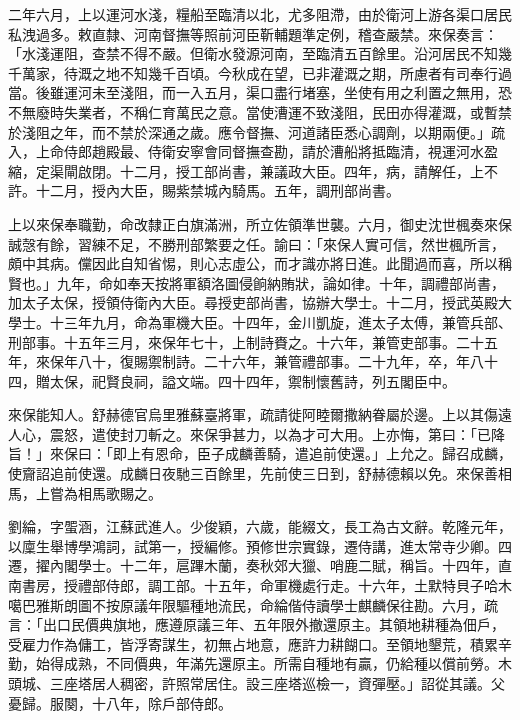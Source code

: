\begin{pinyinscope}
二年六月，上以運河水淺，糧船至臨清以北，尤多阻滯，由於衛河上游各渠口居民私洩過多。敕直隸、河南督撫等照前河臣靳輔題準定例，稽查嚴禁。來保奏言：「水淺運阻，查禁不得不嚴。但衛水發源河南，至臨清五百餘里。沿河居民不知幾千萬家，待溉之地不知幾千百頃。今秋成在望，已非灌溉之期，所慮者有司奉行過當。後雖運河未至淺阻，而一入五月，渠口盡行堵塞，坐使有用之利置之無用，恐不無廢時失業者，不稱仁育萬民之意。當使漕運不致淺阻，民田亦得灌溉，或暫禁於淺阻之年，而不禁於深通之歲。應令督撫、河道諸臣悉心調劑，以期兩便。」疏入，上命侍郎趙殿最、侍衛安寧會同督撫查勘，請於漕船將抵臨清，視運河水盈縮，定渠閘啟閉。十二月，授工部尚書，兼議政大臣。四年，病，請解任，上不許。十二月，授內大臣，賜紫禁城內騎馬。五年，調刑部尚書。

上以來保奉職勤，命改隸正白旗滿洲，所立佐領準世襲。六月，御史沈世楓奏來保誠愨有餘，習練不足，不勝刑部繁要之任。諭曰：「來保人實可信，然世楓所言，頗中其病。儻因此自知省惕，則心志虛公，而才識亦將日進。此聞過而喜，所以稱賢也。」九年，命如奉天按將軍額洛圖侵餉納賄狀，論如律。十年，調禮部尚書，加太子太保，授領侍衛內大臣。尋授吏部尚書，協辦大學士。十二月，授武英殿大學士。十三年九月，命為軍機大臣。十四年，金川凱旋，進太子太傅，兼管兵部、刑部事。十五年三月，來保年七十，上制詩賚之。十六年，兼管吏部事。二十五年，來保年八十，復賜禦制詩。二十六年，兼管禮部事。二十九年，卒，年八十四，贈太保，祀賢良祠，謚文端。四十四年，禦制懷舊詩，列五閣臣中。

來保能知人。舒赫德官烏里雅蘇臺將軍，疏請徙阿睦爾撒納眷屬於邊。上以其傷遠人心，震怒，遣使封刀斬之。來保爭甚力，以為才可大用。上亦悔，第曰：「已降旨！」來保曰：「即上有恩命，臣子成麟善騎，遣追前使還。」上允之。歸召成麟，使齎詔追前使還。成麟日夜馳三百餘里，先前使三日到，舒赫德賴以免。來保善相馬，上嘗為相馬歌賜之。

劉綸，字蜰涵，江蘇武進人。少俊穎，六歲，能綴文，長工為古文辭。乾隆元年，以廩生舉博學鴻詞，試第一，授編修。預修世宗實錄，遷侍講，進太常寺少卿。四遷，擢內閣學士。十二年，扈蹕木蘭，奏秋郊大獵、哨鹿二賦，稱旨。十四年，直南書房，授禮部侍郎，調工部。十五年，命軍機處行走。十六年，土默特貝子哈木噶巴雅斯朗圖不按原議年限驅種地流民，命綸偕侍讀學士麒麟保往勘。六月，疏言：「出口民價典旗地，應遵原議三年、五年限外撤還原主。其領地耕種為佃戶，受雇力作為傭工，皆浮寄謀生，初無占地意，應許力耕餬口。至領地墾荒，積累辛勤，始得成熟，不同價典，年滿先還原主。所需自種地有贏，仍給種以償前勞。木頭城、三座塔居人稠密，許照常居住。設三座塔巡檢一，資彈壓。」詔從其議。父憂歸。服闋，十八年，除戶部侍郎。


\end{pinyinscope}
